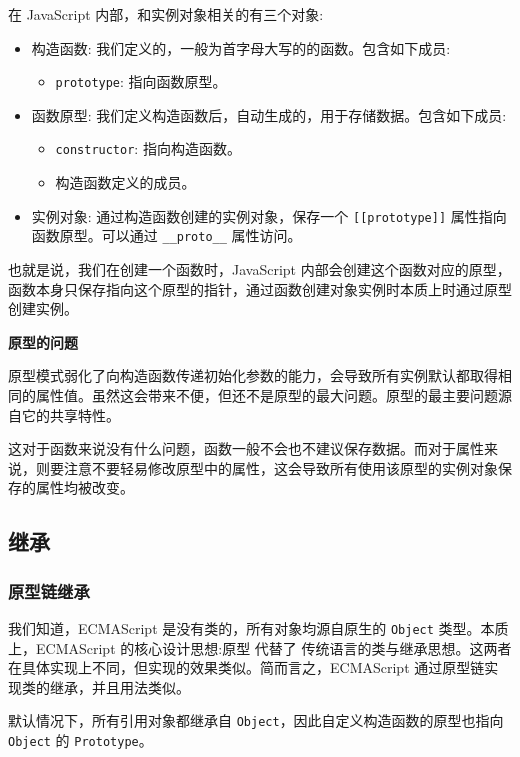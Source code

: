 在 JavaScript 内部，和实例对象相关的有三个对象:
\begin{itemize}
    \item 构造函数: 我们定义的，一般为首字母大写的的函数。包含如下成员:
    \begin{itemize}
        \item \texttt{prototype}: 指向函数原型。
    \end{itemize}
    \item 函数原型: 我们定义构造函数后，自动生成的，用于存储数据。包含如下成员:
    \begin{itemize}
        \item \texttt{constructor}: 指向构造函数。
        \item 构造函数定义的成员。
    \end{itemize}
    \item 实例对象: 通过构造函数创建的实例对象，保存一个 \texttt{[[prototype]]} 属性指向函数原型。可以通过 \texttt{\_\_proto\_\_} 属性访问。
\end{itemize}

也就是说，我们在创建一个函数时，JavaScript 内部会创建这个函数对应的原型，函数本身只保存指向这个原型的指针，通过函数创建对象实例时本质上时通过原型创建实例。

\noindent\textbf{原型的问题}

原型模式弱化了向构造函数传递初始化参数的能力，会导致所有实例默认都取得相同的属性值。虽然这会带来不便，但还不是原型的最大问题。原型的最主要问题源自它的共享特性。

这对于函数来说没有什么问题，函数一般不会也不建议保存数据。而对于属性来说，则要注意不要轻易修改原型中的属性，这会导致所有使用该原型的实例对象保存的属性均被改变。

\subsection{继承}

\subsubsection{原型链继承}

我们知道，ECMAScript 是没有类的，所有对象均源自原生的 \texttt{Object} 类型。本质上，ECMAScript 的核心设计思想:原型 代替了 传统语言的类与继承思想。这两者在具体实现上不同，但实现的效果类似。简而言之，ECMAScript 通过原型链实现类的继承，并且用法类似。

默认情况下，所有引用对象都继承自 \texttt{Object}，因此自定义构造函数的原型也指向 \texttt{Object} 的 \texttt{Prototype}。 

